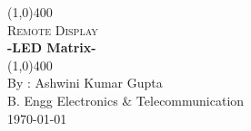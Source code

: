 \begin{titlepage}
		\begin{center}
			\vspace*{1cm}
			\vfill
			\line(1,0){400}\\[1mm]
			\Huge{\textsc{Remote Display}}\\ [3mm]
			\huge{\textbf{-LED Matrix-}}\\ [1mm]
			\line(1,0){400}\\
			\vfill 
			\large{By : Ashwini Kumar Gupta\\
			B. Engg  Electronics \& Telecommunication\\}
			\today\\
			
		\end{center}
\end{titlepage}